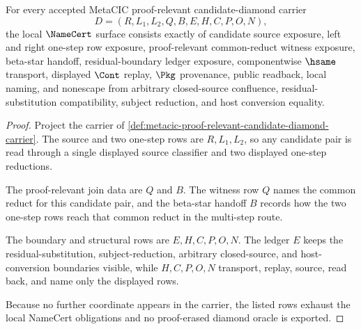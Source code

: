\begin{theorem}\label{thm:metacic-proof-relevant-candidate-diamond-namecert-obligations}
For every accepted MetaCIC proof-relevant candidate-diamond carrier
$$
D=(R,L_1,L_2,Q,B,E,H,C,P,O,N),
$$
the local $\NameCert$ surface consists exactly of candidate source exposure, left and right one-step row exposure, proof-relevant common-reduct witness exposure, beta-star handoff, residual-boundary ledger exposure, componentwise $\hsame$ transport, displayed $\Cont$ replay, $\Pkg$ provenance, public readback, local naming, and nonescape from arbitrary closed-source confluence, residual-substitution compatibility, subject reduction, and host conversion equality.
\end{theorem}
\begin{proof}
Project the carrier of \autoref{def:metacic-proof-relevant-candidate-diamond-carrier}. The source and two one-step rows are $R,L_1,L_2$, so any candidate pair is read through a single displayed source classifier and two displayed one-step reductions.

The proof-relevant join data are $Q$ and $B$. The witness row $Q$ names the common reduct for this candidate pair, and the beta-star handoff $B$ records how the two one-step rows reach that common reduct in the multi-step route.

The boundary and structural rows are $E,H,C,P,O,N$. The ledger $E$ keeps the residual-substitution, subject-reduction, arbitrary closed-source, and host-conversion boundaries visible, while $H,C,P,O,N$ transport, replay, source, read back, and name only the displayed rows.

Because no further coordinate appears in the carrier, the listed rows exhaust the local NameCert obligations and no proof-erased diamond oracle is exported.
\end{proof}

